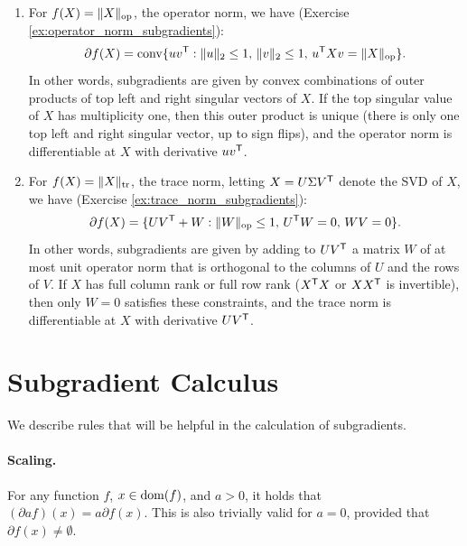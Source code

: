 \begin{Example}
\begin{enumerate}[label=\alph*., ref=\alph*]
\item {} 
  For $f(X) = \|X\|_{\mathrm{op}}$, the operator norm, we have (Exercise
  \ref{ex:operator_norm_subgradients}):  
  \[
  \partial f(X) = \operatorname{conv} \{ u v^{\mathsf{T}} : \|u\|_2 \leq 1, \, \|v\|_2 \leq 1, \, u^{\mathsf{T}} X
  v =  \|X\|_{\mathrm{op}} \}.  
  \]
  In other words, subgradients are given by convex combinations of outer 
  products of top left and right singular vectors of $X$. If the top singular
  value of $X$ has multiplicity one, then this outer product is unique (there is
  only one top left and right singular vector, up to sign flips), and the
  operator norm is differentiable at $X$ with derivative $u v^{\mathsf{T}}$.         

\item {}  
  For $f(X) = \|X\|_{\operatorname{tr}}$, the trace norm, letting $X = U \Sigma V^{\mathsf{T}}$ denote
  the SVD of $X$, we have (Exercise \ref{ex:trace_norm_subgradients}):   
  \[
  \partial f(X) = \{ U V^{\mathsf{T}} + W: \|W\|_{\mathrm{op}} \leq 1, \, U^{\mathsf{T}} W = 0, \, W V = 0
  \}. 
  \]
  In other words, subgradients are given by adding to $U V^{\mathsf{T}}$ a matrix $W$ of
  at most unit operator norm that is orthogonal to the columns of $U$ and the
  rows of $V$. If $X$ has full column rank or full row rank ($X^{\mathsf{T}} X$ or $X
  X^{\mathsf{T}}$ is invertible), then only $W=0$ satisfies these constraints, and the
  trace norm is differentiable at $X$ with derivative $U V^{\mathsf{T}}$.    
\end{enumerate}
\end{Example}

\section{Subgradient Calculus}

We describe rules that will be helpful in the calculation of subgradients. 


\paragraph{Scaling.}

For any function $f$, $x \in \operatorname{dom}(f)$, and $a>0$, it holds that $(\partial a
f)(x) = a \partial f(x)$. This is also trivially valid for $a=0$, provided that
$\partial f(x) \not= \emptyset$.  

